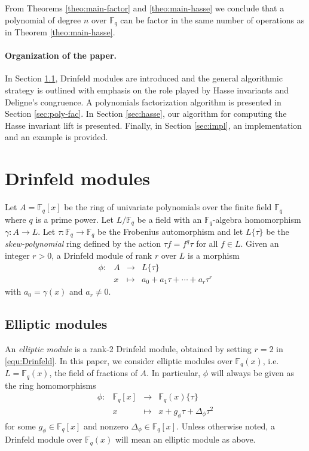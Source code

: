 \documentclass[12pt]{article}
\theoremstyle{plain}
\theoremstyle{definition}
\newcommand{\ang}[1]{\{#1\}}
\def\F{\ensuremath{\mathbb{F}}}
\begin{document}
From Theorems \ref{theo:main-factor} and \ref{theo:main-hasse} we conclude that a polynomial of 
degree $n$ over $\F_q$ can be factor in the same number of operations as in Theorem 
\ref{theo:main-hasse}.

\paragraph{Organization of the paper.}
In Section \ref{sec:drinfeld}, Drinfeld modules are introduced and the general algorithmic 
strategy is outlined with emphasis on the role played by Hasse invariants and Deligne's congruence. 
A polynomials factorization algorithm is presented in Section \ref{sec:poly-fac}. In Section 
\ref{sec:hasse}, our algorithm for computing the Hasse invariant lift is presented. Finally, in 
Section \ref{sec:impl}, an implementation and an example is provided.
 
 
 
 

\section{Drinfeld modules}

Let $A = \F_q[x]$ be the ring of univariate polynomials over the finite field $\F_q$ where $q$ is a 
prime power. Let $L/\F_q$ be a field with an $\F_q$-algebra homomorphism $\gamma: A \rightarrow 
L$. Let $\tau: \F_q \rightarrow \F_q$ be the Frobenius automorphism and let $L\{\tau\}$ be the 
\textit{skew-polynomial} ring defined by the action $\tau f = f^q\tau$ for all $f \in L$. Given an 
integer $r > 0$, a Drinfeld module of rank $r$ over $L$ is a morphism
\begin{equation}
\label{equ:Drinfeld}
	\begin{array}{rrll}
		\phi : & A & \longrightarrow & L\{\tau\} \\
		& x & \longmapsto & a_0 + a_1\tau + \cdots + a_r\tau^r	
	\end{array}
\end{equation}
with $a_0 = \gamma(x)$ and $a_r \ne 0$. 




\subsection{Elliptic modules}
\label{sec:drinfeld}

An \textit{elliptic module} is a rank-2 Drinfeld module, obtained by setting $r = 2$ in 
\eqref{equ:Drinfeld}. In this paper, we consider elliptic modules over $\F_q(x)$, i.e. $L = 
\F_q(x)$, the field of fractions of $A$. In particular, $\phi$ will always be given as the ring 
homomorphisms
\[
\begin{array}{rrll}
	\phi : & \F_q[x] & \longrightarrow & \F_q(x)\ang{\tau} \\
	& x & \longmapsto & x + g_\phi \tau + \Delta_\phi \tau^2	
\end{array}
\]
for some $g_\phi \in \F_q[x]$ and nonzero $\Delta_\phi \in \F_q[x]$. Unless otherwise noted, a 
Drinfeld module over $\F_q(x)$ will mean an elliptic module as above. 
\end{document}
